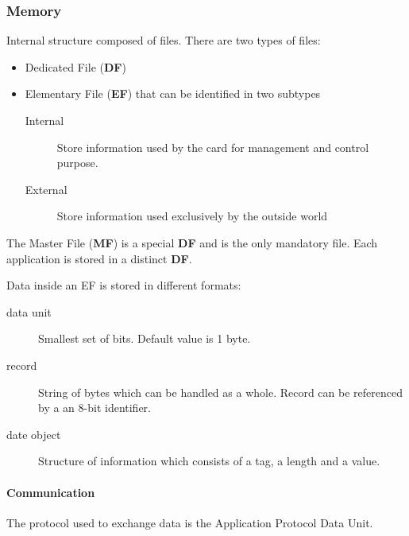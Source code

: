 \subsubsection{Memory}
Internal structure composed of files. There are two types of files:
\begin{itemize}
    \item Dedicated File (\textbf{DF})
    \item Elementary File (\textbf{EF}) that can be identified in two subtypes
    \begin{description}
        \item[Internal] Store information used by the card for management and
        control purpose.
        \item[External] Store information used exclusively by the outside world
    \end{description}
\end{itemize}
The Master File (\textbf{MF}) is a special \textbf{DF} and is the only mandatory
file. Each application is stored in a distinct \textbf{DF}.

Data inside an EF is stored in different formats:
\begin{description}
        \item[data unit] Smallest set of bits. Default value is 1 byte.
        \item[record] String of bytes which can be handled as a whole. Record
        can be referenced by a an 8-bit identifier.
        \item[date object] Structure of information which consists of a tag, a
        length and a value.
\end{description}

\paragraph{Communication}
The protocol used to exchange data is the Application Protocol Data Unit.


